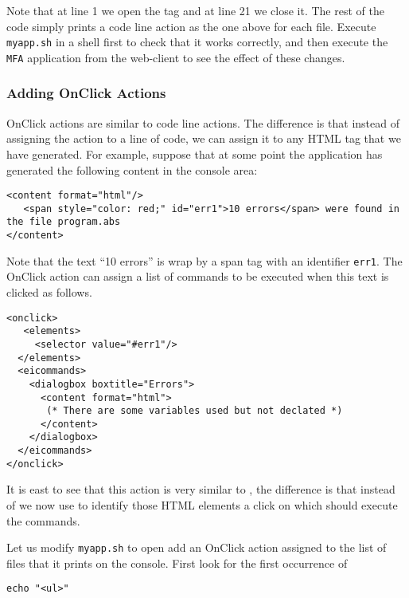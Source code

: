 \medskip
\noindent
Note that at line 1 we open the tag  and at line 21 we
close it. The rest of the code simply prints a code line action as the
one above for each file.
%
Execute \texttt{myapp.sh} in a shell first to check that it works
correctly, and then execute the \texttt{MFA} application from the
web-client to see the effect of these changes.

\subsubsection{Adding OnClick Actions}

OnClick actions are similar to code line actions. The difference is
that instead of assigning the action to a line of code, we can assign
it to any HTML tag that we have generated.
%
For example, suppose that at some point the application has generated
the following content in the console area:

\medskip
\begin{lstlisting}
<content format="html"/>
   <span style="color: red;" id="err1">10 errors</span> were found in the file program.abs
</content>
\end{lstlisting}

\medskip
\noindent
Note that the text ``10 errors'' is wrap by a span tag with an
identifier \texttt{err1}. The OnClick action can assign a list of
commands to be executed when this text is clicked as follows.

\begin{lstlisting}
<onclick>
   <elements>
     <selector value="#err1"/>
  </elements>
  <eicommands>
    <dialogbox boxtitle="Errors"> 
      <content format="html">
       (* There are some variables used but not declated *)
      </content>
    </dialogbox>
  </eicommands>
</onclick>
\end{lstlisting}

\medskip
\noindent
It is east to see that this action is very similar to
, the difference is that instead of  we
now use  to identify those HTML elements a click on
which should execute the commands. 

Let us modify \texttt{myapp.sh} to open add an OnClick action assigned
to the list of files that it prints on the console. First look for the
first occurrence of 

\medskip
\begin{lstlisting}[style=script]
echo "<ul>"
\end{lstlisting}


